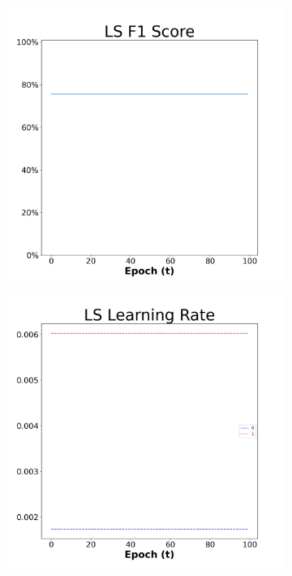 \begin{figure}[H]
    \centering %
\begin{subfigure}{0.3\textwidth}
  \includegraphics[width=\linewidth]{images/exper2/NSP/LS_0.01_f1.png}
    \includegraphics[width=\linewidth]{images/exper2/NSP/LS_0.01_lr.png}

\end{subfigure}
\end{figure}
